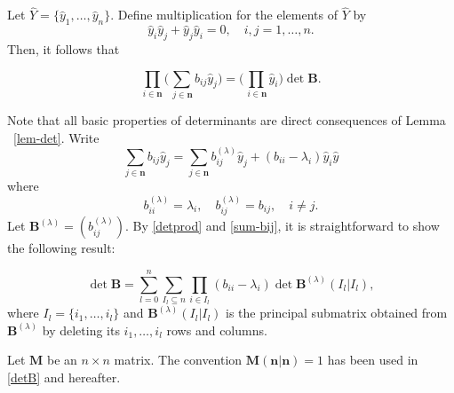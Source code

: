 \documentclass[mlq,fleqn]{w-art}
\newcommand{\wh}{\widehat}
\begin{document}
Let $\wh Y=\{\hat y_1,\dots,\hat y_n\}$. Define multiplication
for the elements of $\wh Y$ by
\begin{equation}
\hat y_i\hat y_j+\hat y_j\hat y_i=0,\quad i,j=1,\dots,n.
\end{equation}
Then, it follows that
\begin{lem}\label{lem-det}
\begin{equation}\label{detprod}
\prod_{i\in\mathbf{n}}
\biggl(\sum_{\,j\in\mathbf{n}}b_{ij}\hat y_j\biggr)
=\biggl(\prod_{\,i\in\mathbf{n}}\hat y_i\biggr)\det\mathbf{B}.
\end{equation}
\end{lem}

Note that all basic properties of determinants are direct consequences
of Lemma ~\ref{lem-det}. Write
\begin{equation}\label{sum-bij}
\sum_{j\in\mathbf{n}}b_{ij}\hat y_j=\sum_{j\in\mathbf{n}}b^{(\lambda)}
_{ij}\hat y_j+(b_{ii}-\lambda_i)\hat y_i\hat y
\end{equation}
where
\begin{equation}
b^{(\lambda)}_{ii}=\lambda_i,\quad b^{(\lambda)}_{ij}=b_{ij},
\quad i\not=j.
\end{equation}
Let $\mathbf{B}^{(\lambda)}=(b^{(\lambda)}_{ij})$. By \eqref{detprod}
and \eqref{sum-bij}, it is
straightforward to show the following
result:
\begin{thm}\label{thm-main}
\begin{equation}\label{detB}
\det\mathbf{B}=
\sum^n_{l =0}\sum_{I_l \subseteq n}
\prod_{i\in I_l}(b_{ii}-\lambda_i)
\det\mathbf{B}^{(\lambda)}(I_l |I_l ),
\end{equation}
where $I_l =\{i_1,\dots,i_l \}$ and $\mathbf{B}^{(\lambda)}(I_l |I_l )$
is the principal submatrix obtained from $\mathbf{B}^{(\lambda)}$
by deleting its $i_1,\dots,i_l $ rows and columns.
\end{thm}

\begin{rem}
Let $\mathbf{M}$ be an $n\times n$ matrix. The convention
$\mathbf{M}(\mathbf{n}|\mathbf{n})=1$ has been used in \eqref{detB} and
hereafter.
\end{rem}
\end{document}
